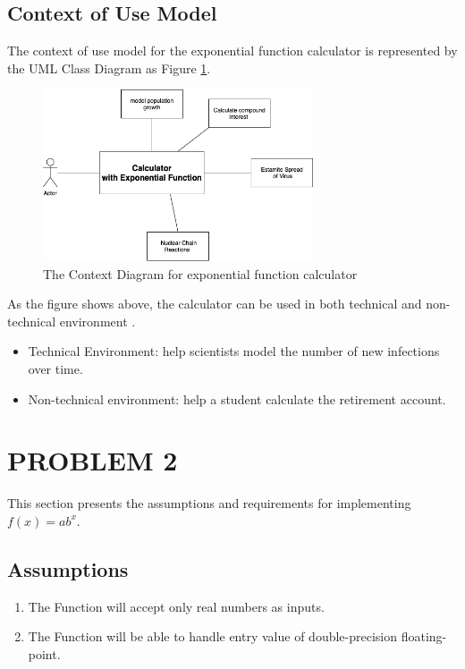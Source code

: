 \documentclass[11pt]{article}
\begin{document}
\subsection{Context of Use Model}
The context of use model for the exponential function calculator is represented by the UML Class Diagram as Figure \ref{fig:context}.
\begin{figure}[h]
    \centering
    \includegraphics[width=8cm]{images/Context_diagram.png}
    \caption{The Context Diagram for exponential function calculator}
    \label{fig:context}
\end{figure}

As the figure shows above, the calculator can be used in both technical and non-technical environment \cite{zelen1966application}\cite{lebanon2001boosting}.
\begin{itemize}
    \item Technical Environment: help scientists model the number of new infections over time.
    \item Non-technical environment: help a student calculate the retirement account.
\end{itemize}

\section{PROBLEM 2}\label{problem2}
This section presents the assumptions and requirements for implementing $f(x)=ab^x$.
\subsection{Assumptions}
\begin{enumerate}
    \item The Function will accept only real numbers as inputs.
    \item The Function will be able to handle entry value of double-precision floating-point.
\end{enumerate}
\end{document}
